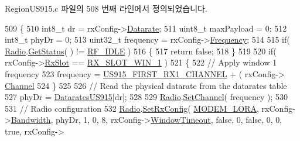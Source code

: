 Region\+U\+S915.\+c 파일의 508 번째 라인에서 정의되었습니다.


\begin{DoxyCode}
509 \{
510     int8\_t dr = rxConfig->\mbox{\hyperlink{structs_rx_config_params_ae2f6080f3aa0e9485c55513ca56bb24d}{Datarate}};
511     uint8\_t maxPayload = 0;
512     int8\_t phyDr = 0;
513     uint32\_t frequency = rxConfig->\mbox{\hyperlink{structs_rx_config_params_ade3d190636488dad9a89b19446b7acf1}{Frequency}};
514 
515     \textcolor{keywordflow}{if}( \mbox{\hyperlink{sx1276mb1las_8c_acf9fe61a72c16fa29a0dc449d23e3820}{Radio}}.\mbox{\hyperlink{struct_radio__s_a8d469520cd62ec3004a50fcaa31d8c72}{GetStatus}}( ) != \mbox{\hyperlink{radio_8h_a2f3fa4ad0237c4ace94aa99086aac9f5a89c1ff89fc074c1c80f96d186c99f899}{RF\_IDLE}} )
516     \{
517         \textcolor{keywordflow}{return} \textcolor{keyword}{false};
518     \}
519 
520     \textcolor{keywordflow}{if}( rxConfig->\mbox{\hyperlink{structs_rx_config_params_a0a258bf8cfad5219bfd579257e523fc1}{RxSlot}} == \mbox{\hyperlink{group___l_o_r_a_m_a_c_gga933a5a2f7d57b1a5cb22f061e30558fea5fa7051b96e31f50660867ec02cb6624}{RX\_SLOT\_WIN\_1}} )
521     \{
522         \textcolor{comment}{// Apply window 1 frequency}
523         frequency = \mbox{\hyperlink{group___r_e_g_i_o_n_u_s915_ga8960a091cbb30429c6b69d4d528930d6}{US915\_FIRST\_RX1\_CHANNEL}} + ( rxConfig->
      \mbox{\hyperlink{structs_rx_config_params_a1ca6f01ca18afe402de51babe8c95f5e}{Channel}} %
524     \}
525 
526     \textcolor{comment}{// Read the physical datarate from the datarates table}
527     phyDr = \mbox{\hyperlink{group___r_e_g_i_o_n_u_s915_ga715249ddef431b316389e6ddc55d903b}{DataratesUS915}}[dr];
528 
529     \mbox{\hyperlink{sx1276mb1las_8c_acf9fe61a72c16fa29a0dc449d23e3820}{Radio}}.\mbox{\hyperlink{struct_radio__s_a691bfd16e5be0274cbfe0d7454749f12}{SetChannel}}( frequency );
530 
531     \textcolor{comment}{// Radio configuration}
532     \mbox{\hyperlink{sx1276mb1las_8c_acf9fe61a72c16fa29a0dc449d23e3820}{Radio}}.\mbox{\hyperlink{struct_radio__s_ae4e2616b2534ce84bf4110dc6d31f82f}{SetRxConfig}}( \mbox{\hyperlink{radio_8h_a992ef7a5b7f52975ba7bd8dd97740057abeb331e097974ea65b07d74df9e85a8e}{MODEM\_LORA}}, rxConfig->\mbox{\hyperlink{structs_rx_config_params_aa8fc32e4883d30642e0ceb5845006a57}{Bandwidth}}, phyDr, 1, 0, 8, 
      rxConfig->\mbox{\hyperlink{structs_rx_config_params_a9d9f6c16ea62e2bcc09b100e2cb83e3f}{WindowTimeout}}, \textcolor{keyword}{false}, 0, \textcolor{keyword}{false}, 0, 0, \textcolor{keyword}{true}, rxConfig->

\end{DoxyCode}
